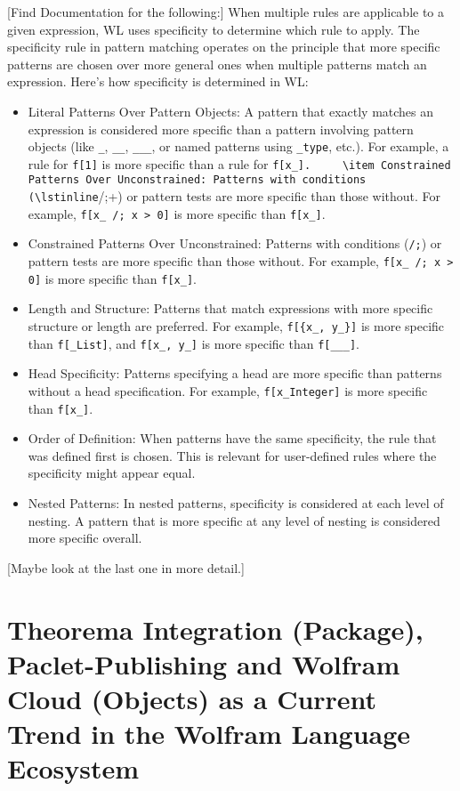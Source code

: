 [Find Documentation for the following:]
When multiple rules are applicable to a given expression, WL uses specificity to determine which rule to apply. The specificity rule in pattern matching operates on the principle that more specific patterns are chosen over more general ones when multiple patterns match an expression. Here's how specificity is determined in WL:

\begin{itemize}
    \item Literal Patterns Over Pattern Objects: A pattern that exactly matches an expression is considered more specific than a pattern involving pattern objects (like \lstinline+_+, \lstinline+__+, \lstinline+___+, or named patterns using \lstinline+_type+, etc.). For example, a rule for \lstinline+f[1]+ is more specific than a rule for \lstinline+f[x_].
    \item Constrained Patterns Over Unconstrained: Patterns with conditions (\lstinline+/;+) or pattern tests are more specific than those without. For example, \lstinline+f[x_ /; x > 0]+ is more specific than \lstinline+f[x_]+.
    \item Constrained Patterns Over Unconstrained: Patterns with conditions (\lstinline+/;+) or pattern tests are more specific than those without. For example, \lstinline+f[x_ /; x > 0]+ is more specific than \lstinline+f[x_]+.
    \item Length and Structure: Patterns that match expressions with more specific structure or length are preferred. For example, \lstinline+f[{x_, y_}]+ is more specific than \lstinline+f[_List]+, and \lstinline+f[x_, y_]+ is more specific than \lstinline+f[___]+.
    \item Head Specificity: Patterns specifying a head are more specific than patterns without a head specification. For example, \lstinline+f[x_Integer]+ is more specific than \lstinline+f[x_]+.
    \item Order of Definition: When patterns have the same specificity, the rule that was defined first is chosen. This is relevant for user-defined rules where the specificity might appear equal.
    \item Nested Patterns: In nested patterns, specificity is considered at each level of nesting. A pattern that is more specific at any level of nesting is considered more specific overall.
\end{itemize}

[Maybe look at the last one in more detail.]


\section{Theorema Integration (Package), Paclet-Publishing and Wolfram Cloud (Objects) as a Current Trend in the Wolfram Language Ecosystem} \label{integration-publishing-cloud}

